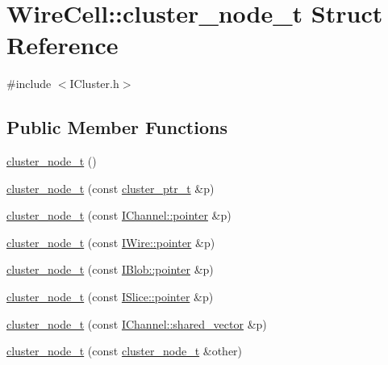 \hypertarget{struct_wire_cell_1_1cluster__node__t}{}\section{Wire\+Cell\+:\+:cluster\+\_\+node\+\_\+t Struct Reference}
\label{struct_wire_cell_1_1cluster__node__t}


{\ttfamily \#include $<$I\+Cluster.\+h$>$}

\subsection*{Public Member Functions}
\begin{DoxyCompactItemize}
\item 
\hyperlink{struct_wire_cell_1_1cluster__node__t_a6f862c89b46ddaf16bf83c0c35b19a78}{cluster\+\_\+node\+\_\+t} ()
\item 
\hyperlink{struct_wire_cell_1_1cluster__node__t_a75d7345726500c3b963c64b8aaa433e4}{cluster\+\_\+node\+\_\+t} (const \hyperlink{namespace_wire_cell_a0dd058393dc7c7e35d888c206b9d479d}{cluster\+\_\+ptr\+\_\+t} \&p)
\item 
\hyperlink{struct_wire_cell_1_1cluster__node__t_a9222a0cc741d2b271928ebde9b9f0224}{cluster\+\_\+node\+\_\+t} (const \hyperlink{class_wire_cell_1_1_i_data_aff870b3ae8333cf9265941eef62498bc}{I\+Channel\+::pointer} \&p)
\item 
\hyperlink{struct_wire_cell_1_1cluster__node__t_a14c62376a04ad8c25d0abeeb0372cf55}{cluster\+\_\+node\+\_\+t} (const \hyperlink{class_wire_cell_1_1_i_data_aff870b3ae8333cf9265941eef62498bc}{I\+Wire\+::pointer} \&p)
\item 
\hyperlink{struct_wire_cell_1_1cluster__node__t_a4707fc8df3f9420ce5c20db24f3a616d}{cluster\+\_\+node\+\_\+t} (const \hyperlink{class_wire_cell_1_1_i_data_aff870b3ae8333cf9265941eef62498bc}{I\+Blob\+::pointer} \&p)
\item 
\hyperlink{struct_wire_cell_1_1cluster__node__t_afb2c66a84c2157b492a2ea1f320a8f26}{cluster\+\_\+node\+\_\+t} (const \hyperlink{class_wire_cell_1_1_i_data_aff870b3ae8333cf9265941eef62498bc}{I\+Slice\+::pointer} \&p)
\item 
\hyperlink{struct_wire_cell_1_1cluster__node__t_a421a58a74eef11c1a6c6fb513aab0a14}{cluster\+\_\+node\+\_\+t} (const \hyperlink{class_wire_cell_1_1_i_data_a6edac35e7dd886018740993b28c7ca1e}{I\+Channel\+::shared\+\_\+vector} \&p)
\item 
\hyperlink{struct_wire_cell_1_1cluster__node__t_a42194b61163742680c46b1717daa05f6}{cluster\+\_\+node\+\_\+t} (const \hyperlink{struct_wire_cell_1_1cluster__node__t}{cluster\+\_\+node\+\_\+t} \&other)

\end{DoxyCompactItemize}
